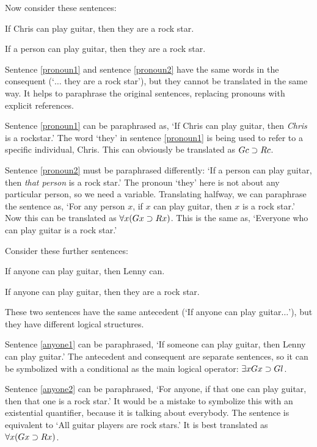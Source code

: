 Now consider these sentences:

\begin{earg}
\item[\ex{pronoun1}] If Chris can play guitar, then they are a rock star.
\item[\ex{pronoun2}] If a person can play guitar, then they are a rock star.
\end{earg}

Sentence \ref{pronoun1} and sentence \ref{pronoun2} have the same words in the consequent (`$\ldots$ they are a rock star'), but they cannot be translated in the same way. It helps to paraphrase the original sentences, replacing pronouns with explicit references.

Sentence \ref{pronoun1} can be paraphrased as, `If Chris can play guitar, then \emph{Chris} is a rockstar.' The word `they' in sentence \ref{pronoun1} is being used to refer to a specific individual, Chris. This can obviously be translated as $Gc \supset Rc$.

Sentence \ref{pronoun2} must be paraphrased differently: `If a person can play guitar, then \emph{that person} is a rock star.' The pronoun `they' here is not about any particular person, so we need a variable. Translating halfway, we can paraphrase the sentence as, `For any person $x$, if $x$ can play guitar, then $x$ is a rock star.' Now this can be translated as $\forall x (Gx \supset Rx)$. This is the same as, `Everyone who can play guitar is a rock star.'


Consider these further sentences:

\begin{earg}
\item[\ex{anyone1}] If anyone can play guitar, then Lenny can.
\item[\ex{anyone2}] If anyone can play guitar, then they are a rock star.
\end{earg}

These two sentences have the same antecedent (`If anyone can play guitar$\ldots$'), but they have different logical structures.

Sentence \ref{anyone1} can be paraphrased, `If someone can play guitar, then Lenny can play guitar.' The antecedent and consequent are separate sentences, so it can be symbolized with a conditional as the main logical operator: $\exists x Gx \supset Gl$.

Sentence \ref{anyone2} can be paraphrased, `For anyone, if that one can play guitar, then that one is a rock star.' It would be a mistake to symbolize this with an existential quantifier, because it is talking about everybody. The sentence is equivalent to `All guitar players are rock stars.' It is best translated as $\forall x(Gx \supset Rx)$.

